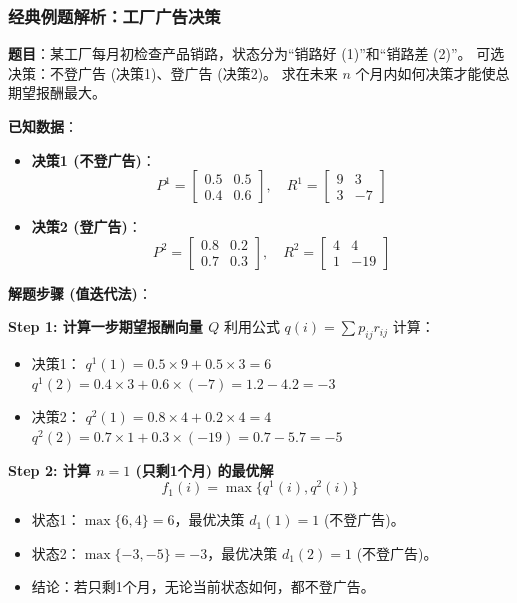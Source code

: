 \documentclass[a4paper,12pt]{ctexart} %
\begin{document}
	\subsubsection{经典例题解析：工厂广告决策}
	
	\textbf{题目}：某工厂每月初检查产品销路，状态分为“销路好 (1)”和“销路差 (2)”。
	可选决策：不登广告 (决策1)、登广告 (决策2)。
	求在未来 $n$ 个月内如何决策才能使总期望报酬最大。
	
	\textbf{已知数据}：
	\begin{itemize}
		\item \textbf{决策1 (不登广告)}：
		\[ P^1 = \begin{bmatrix} 0.5 & 0.5 \\ 0.4 & 0.6 \end{bmatrix}, \quad R^1 = \begin{bmatrix} 9 & 3 \\ 3 & -7 \end{bmatrix} \]
		\item \textbf{决策2 (登广告)}：
		\[ P^2 = \begin{bmatrix} 0.8 & 0.2 \\ 0.7 & 0.3 \end{bmatrix}, \quad R^2 = \begin{bmatrix} 4 & 4 \\ 1 & -19 \end{bmatrix} \]
	\end{itemize}
	
	\textbf{解题步骤 (值迭代法)}：
	
	\textbf{Step 1: 计算一步期望报酬向量 $Q$}
	利用公式 $q(i) = \sum p_{ij} r_{ij}$ 计算：
	\begin{itemize}
		\item 决策1：
		$q^1(1) = 0.5 \times 9 + 0.5 \times 3 = 6$
		$q^1(2) = 0.4 \times 3 + 0.6 \times (-7) = 1.2 - 4.2 = -3$
		\item 决策2：
		$q^2(1) = 0.8 \times 4 + 0.2 \times 4 = 4$
		$q^2(2) = 0.7 \times 1 + 0.3 \times (-19) = 0.7 - 5.7 = -5$
	\end{itemize}
	
	\textbf{Step 2: 计算 $n=1$ (只剩1个月) 的最优解}
	\[ f_1(i) = \max \{ q^1(i), q^2(i) \} \]
	\begin{itemize}
		\item 状态1：$\max\{6, 4\} = 6$，最优决策 $d_1(1) = 1$ (不登广告)。
		\item 状态2：$\max\{-3, -5\} = -3$，最优决策 $d_1(2) = 1$ (不登广告)。
		\item 结论：若只剩1个月，无论当前状态如何，都不登广告。
	\end{itemize}
	
\end{document}
